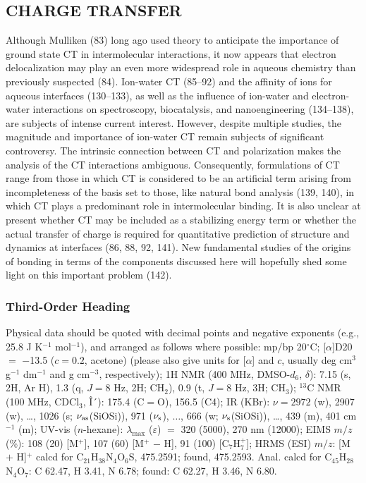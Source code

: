 \documentclass{ar-1col}
\begin{document}
\begin{textbox}
\section{CHARGE TRANSFER}
Although Mulliken (83) long ago used theory to anticipate the importance of ground state CT in intermolecular interactions, it now appears that electron delocalization may play an even more widespread role in aqueous chemistry than previously suspected (84). Ion-water CT (85--92) and the affinity of ions for aqueous interfaces (130--133), as well as the influence of ion-water and electron-water interactions on spectroscopy, biocatalysis, and nanoengineering (134--138), are subjects of intense current interest. However, despite multiple studies, the magnitude and importance of ion-water CT remain subjects of significant controversy. The intrinsic connection between CT and polarization makes the analysis of the CT interactions ambiguous. Consequently, formulations of CT range from those in which CT is considered to be an artificial term arising from incompleteness of the basis set to those, like natural bond analysis (139, 140), in which CT plays a predominant role in intermolecular binding. It is also unclear at present whether CT may be included as a stabilizing energy term or whether the actual transfer of charge is required for quantitative prediction of structure and dynamics at interfaces (86, 88, 92, 141). New fundamental studies of the origins of bonding in terms of the components discussed here will hopefully shed some light on this important problem (142).
\end{textbox}



\subsubsection{Third-Order Heading}
Physical data should be quoted with decimal points and negative exponents (e.g., 25.8 J K$^{-1}$ mol$^{-1}$), and arranged as follows where possible: mp/bp 20$^{\circ}$C; [$\alpha$]D20 $=$ $-$13.5 ($c = 0.2$, acetone) (please also give units for [$\alpha$] and $c$, usually deg cm$^3$ g$^{-1}$ dm$^{-1}$ and g cm$^{-3}$, respectively); 1H NMR (400 MHz, DMSO-$d_6$, $\delta$): 7.15 (s, 2H, Ar H), 1.3 (q, $J = 8$ Hz, 2H; CH$_2$), 0.9 (t, $J = 8$ Hz, 3H; CH$_3$); $^{13}$C NMR (100 MHz, CDCl$_3$, Î´): 175.4 (C$=$O), 156.5 (C4); IR (KBr): $\nu = 2972$ (w), 2907 (w), \ldots, 1026 (s; $\nu_{\rm as}$(SiOSi)), 971 ($\nu_{\rm s}$), $\ldots$, 666 (w; $\nu_{\rm s}$(SiOSi)), \ldots, 439 (m), 401 cm$^{-1}$ (m); UV-vis ($n$-hexane): $\lambda_{\max}$ ($\varepsilon$) $=$ 320 (5000), 270 nm (12000); EIMS $m/z$ (\%): 108 (20) [M$^+$], 107 (60) [M$^+$ $-$ H], 91 (100) [C$_7$H$_7^+$]; HRMS (ESI) $m/z$: [M $+$ H]$^+$ calcd for C$_{21}$H$_{38}$N$_{4}$O$_{6}$S, 475.2591; found, 475.2593. Anal. calcd for C$_{45}$H$_{28}$N$_{4}$O$_{7}$: C 62.47, H 3.41, N 6.78; found: C 62.27, H 3.46, N 6.80.
\end{document}
